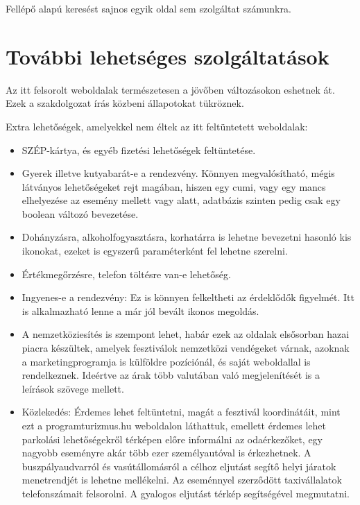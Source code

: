 Fellépő alapú keresést sajnos egyik oldal sem szolgáltat számunkra.

\section{További lehetséges szolgáltatások}

Az itt felsorolt weboldalak természetesen a jövőben változásokon eshetnek át. Ezek a szakdolgozat írás közbeni állapotokat tükröznek.

Extra lehetőségek, amelyekkel nem éltek az itt feltüntetett weboldalak:
\begin{itemize}
\item SZÉP-kártya, és egyéb fizetési lehetőségek feltüntetése.

\item Gyerek illetve kutyabarát-e a rendezvény. Könnyen megvalósítható, mégis látványos lehetőségeket rejt magában, hiszen egy cumi, vagy egy mancs elhelyezése az esemény mellett vagy alatt, adatbázis szinten pedig csak egy boolean változó bevezetése.

\item Dohányzásra, alkoholfogyasztásra, korhatárra is lehetne bevezetni hasonló kis ikonokat, ezeket is egyszerű paraméterként fel lehetne szerelni.

\item Értékmegőrzésre, telefon töltésre van-e lehetőség. 

\item Ingyenes-e a rendezvény: Ez is könnyen felkeltheti az érdeklődők figyelmét. Itt is alkalmazható lenne a már jól bevált ikonos megoldás.

\item A nemzetköziesítés is szempont lehet, habár ezek az oldalak elsősorban hazai piacra készültek, amelyek fesztiválok nemzetközi vendégeket várnak, azoknak a marketingprogramja is külföldre pozíciónál, és saját weboldallal is rendelkeznek. Ideértve az árak több valutában való megjelenítését is a leírások szövege mellett.

\item Közlekedés: Érdemes lehet feltüntetni, magát a fesztivál koordinátáit, mint ezt a programturizmus.hu weboldalon láthattuk, emellett érdemes lehet parkolási lehetőségekről térképen előre informálni az odaérkezőket, egy nagyobb eseményre akár több ezer személyautóval is érkezhetnek. A buszpályaudvarról és vasútállomásról a célhoz eljutást segítő helyi járatok menetrendjét is lehetne mellékelni. Az eseménnyel szerződött taxivállalatok telefonszámait felsorolni. A gyalogos eljutást térkép segítségével megmutatni.


\end{itemize}

